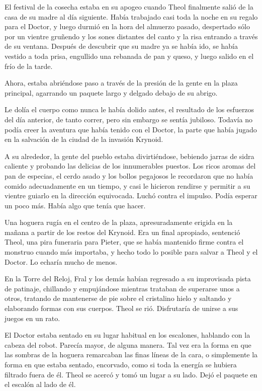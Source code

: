 
El festival de la cosecha estaba en su apogeo cuando Theol finalmente salió de la casa de su madre al día siguiente. Había trabajado casi toda la noche en su regalo para el Doctor, y luego durmió en la hora del almuerzo pasado, despertado sólo por un vientre gruñendo y los sones distantes del canto y la risa entrando a través de su ventana. Después de descubrir que su madre ya se había ido, se había vestido a toda prisa, engullido una rebanada de pan y queso, y luego salido en el frío de la tarde.



Ahora, estaba abriéndose paso a través de la presión de la gente en la plaza principal, agarrando un paquete largo y delgado debajo de su abrigo.



Le dolía el cuerpo como nunca le había dolido antes, el resultado de los esfuerzos del día anterior, de tanto correr, pero sin embargo se sentía jubiloso. Todavía no podía creer la aventura que había tenido con el Doctor, la parte que había jugado en la salvación de la ciudad de la invasión Krynoid.



A su alrededor, la gente del pueblo estaba divirtiéndose, bebiendo jarras de sidra caliente y probando las delicias de los innumerables puestos. Los ricos aromas del pan de especias, el cerdo asado y los bollos pegajosos le recordaron que no había comido adecuadamente en un tiempo, y casi le hicieron rendirse y permitir a su vientre guiarlo en la dirección equivocada. Luchó contra el impulso. Podía esperar un poco más. Había algo que tenía que hacer.



Una hoguera rugía en el centro de la plaza, apresuradamente erigida en la mañana a partir de los restos del Krynoid. Era un final apropiado, sentenció Theol, una pira funeraria para Pieter, que se había mantenido firme contra el monstruo cuando más importaba, y hecho todo lo posible para salvar a Theol y el Doctor. Lo echaría mucho de menos.



En la Torre del Reloj, Fral y los demás habían regresado a su improvisada pista de patinaje, chillando y empujándose mientras trataban de superarse unos a otros, tratando de mantenerse de pie sobre el cristalino hielo y saltando y elaborando formas con sus cuerpos. Theol se rió. Disfrutaría de unirse a sus juegos en un rato.



El Doctor estaba sentado en su lugar habitual en los escalones, hablando con la cabeza del robot. Parecía mayor, de alguna manera. Tal vez era la forma en que las sombras de la hoguera remarcaban las finas líneas de la cara, o simplemente la forma en que estaba sentado, encorvado, como si toda la energía se hubiera filtrado fuera de él. Theol se acercó y tomó un lugar a su lado. Dejó el paquete en el escalón al lado de él.



